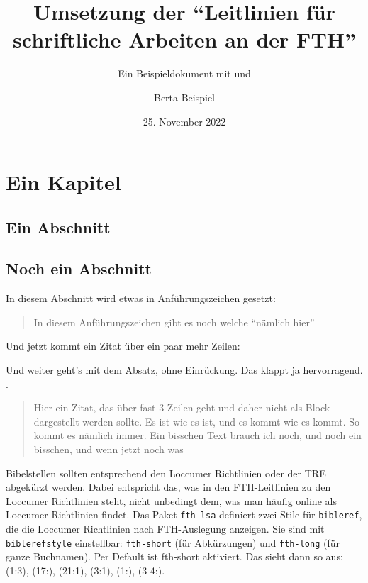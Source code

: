 \documentclass{scrreport}
\begin{document}
\title{Umsetzung der \enquote{Leitlinien für schriftliche Arbeiten an der FTH}}
\subtitle{Ein Beispieldokument mit  und }
\author{Berta Beispiel}
\date{25. November 2022}

\maketitle

\tableofcontents

\chapter{Ein Kapitel}
\label{chap:firstchapter}
\section{Ein Abschnitt}
\lipsum

\section{Noch ein Abschnitt}
In diesem Abschnitt wird etwas in Anführungszeichen gesetzt: \blockquote{In diesem Anführungszeichen gibt es noch welche \enquote{nämlich hier}}. Und jetzt kommt ein Zitat über ein paar mehr Zeilen: \blockquote{\lipsum[1]} Und weiter geht's mit dem Absatz, ohne Einrückung. Das klappt ja hervorragend. \lipsum[2]. \blockquote{Hier ein Zitat, das über fast 3 Zeilen geht und daher nicht als Block dargestellt werden sollte. Es ist wie es ist, und es kommt wie es kommt. So kommt es nämlich immer. Ein bisschen Text brauch ich noch, und noch ein bisschen, und wenn jetzt noch was}

\sloppy
Bibelstellen sollten entsprechend den Loccumer Richtlinien oder der TRE abgekürzt werden. Dabei entspricht das, was in den FTH-Leitlinien zu den Loccumer Richtlinien steht, nicht unbedingt dem, was man häufig online als Loccumer Richtlinien findet. Das Paket \texttt{fth-lsa} definiert zwei Stile für \texttt{bibleref}, die die Loccumer Richtlinien nach FTH-Auslegung anzeigen. Sie sind mit \texttt{biblerefstyle} einstellbar: \texttt{fth-short} (für Abkürzungen) und \texttt{fth-long} (für ganze Buchnamen). Per Default ist fth-short aktiviert. Das sieht dann so aus: (1:3), (17:), (21:1), (3:1), (1:), (3-4:).
\end{document}
